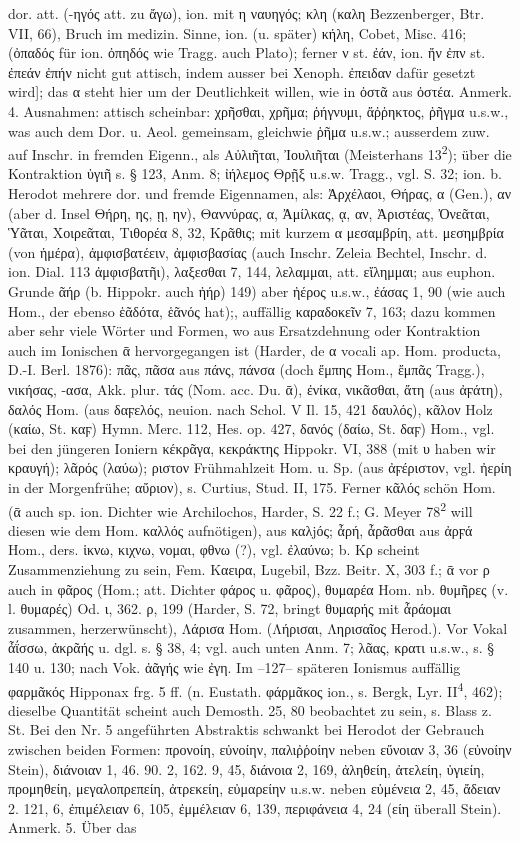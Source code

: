 dor. att. (-ηγός att. zu ἄγω), ion. mit η ναυηγός; κλη (καλη Bezzenberger, Btr. VII, 66), Bruch im medizin. Sinne, ion. (u. später) κήλη, Cobet, Misc. 416; (ὀπαδός für ion. ὀπηδός wie Tragg. auch Plato); ferner ν st. ἐάν, ion. ἤν ἐπν st. ἐπεάν ἐπήν nicht gut attisch, indem ausser bei Xenoph. ἐπειδαν dafür gesetzt wird]; das α steht hier um der Deutlichkeit willen, wie in ὀστᾶ aus ὀστέα. Anmerk. 4. Ausnahmen: attisch scheinbar: χρῆσθαι, χρῆμα; ῥήγνυμι, ἄῤῥηκτος, ῥῆγμα u.s.w., was auch dem Dor. u. Aeol. gemeinsam, gleichwie ῥῆμα u.s.w.; ausserdem zuw. auf Inschr. in fremden Eigenn., als Αὐλιῆται, Ἰουλιῆται (Meisterhans 13\textsuperscript{2}); über die Kontraktion ὑγιῆ s. § 123, Anm. 8; ἰήλεμος Θρῇξ u.s.w. Tragg., vgl. S. 32; ion. b. Herodot mehrere dor. und fremde Eigennamen, als: Ἀρχέλαοι, Θήρας, α (Gen.), αν (aber d. Insel Θήρη, ης, ῃ, ην), Θαννύρας, α, Ἀμίλκας, ᾳ, αν, Ἀριστέας, Ὀνεᾶται, Ὑᾶται, Χοιρεᾶται, Τιθορέα 8, 32, Κρᾶθις; mit kurzem α μεσαμβρίη, att. μεσημβρία (von ἡμέρα), ἀμφισβατέειν, ἀμφισβασίας (auch Inschr. Zeleia Bechtel, Inschr. d. ion. Dial. 113 ἀμφισβατῆι), λαξεσθαι 7, 144, λελαμμαι, att. εἴλημμαι; aus euphon. Grunde ᾶήρ (b. Hippokr. auch ἠήρ) 149) aber ἠέρος u.s.w., ἐάσας 1, 90 (wie auch Hom., der ebenso ἑᾶδότα, ἑᾶνός hat);, auffällig καραδοκεῖν 7, 163; dazu kommen aber sehr viele Wörter und Formen, wo aus Ersatzdehnung oder Kontraktion auch im Ionischen ᾱ hervorgegangen ist (Harder, de α vocali ap. Hom. producta, D.-I. Berl. 1876): πᾶς, πᾶσα aus πάνς, πάνσα (doch ἔμπης Hom., ἔμπᾶς Tragg.), νικήσας, -ασα, Akk. plur. τάς (Nom. acc. Du. ᾱ), ἐνίκα, νικᾶσθαι, ἄτη (aus ἀϝάτη), δαλός Hom. (aus δαϝελός, neuion. nach Schol. V Il. 15, 421 δαυλός), κᾶλον Holz (καίω, St. καϝ) Hymn. Merc. 112, Hes. op. 427, δανός (δαίω, St. δαϝ) Hom., vgl. bei den jüngeren Ioniern κέκρᾶγα, κεκράκτης Hippokr. VI, 388 (mit υ haben wir κραυγή); λᾶρός (λαύω); ριστον Frühmahlzeit Hom. u. Sp. (aus ἀϝέριστον, vgl. ἠερίη in der Morgenfrühe; αὔριον), s. Curtius, Stud. II, 175. Ferner κᾶλός schön Hom. (ᾱ auch sp. ion. Dichter wie Archilochos, Harder, S. 22 f.; G. Meyer 78\textsuperscript{2} will diesen wie dem Hom. καλλός aufnötigen), aus καλjός; ἆρή, ἆρᾶσθαι aus ἀρϝά Hom., ders. ἱκνω, κιχνω, νομαι, φθνω (?), vgl. ἐλαύνω; b. Κρ scheint Zusammenziehung zu sein, Fem. Καειρα, Lugebil, Bzz. Beitr. X, 303 f.; ᾱ vor ρ auch in φᾶρος (Hom.; att. Dichter φάρος u. φᾶρος), θυμαρέα Hom. nb. θυμῆρες (v. l. θυμαρές) Od. ι, 362. ρ, 199 (Harder, S. 72, bringt θυμαρής mit ἆράομαι zusammen, herzerwünscht), Λάρισα Hom. (Λήρισαι, Ληρισαῖος Herod.). Vor Vokal ἆΐσσω, ἀκρᾶής u. dgl. s. § 38, 4; vgl. auch unten Anm. 7; λᾶας, κρατι u.s.w., s. § 140 u. 130; nach Vok. ἀᾶγής wie ἐγη. Im --127-- späteren Ionismus auffällig φαρμᾶκός Hipponax frg. 5 ff. (n. Eustath. φάρμᾶκος ion., s. Bergk, Lyr. II\textsuperscript{4}, 462); dieselbe Quantität scheint auch Demosth. 25, 80 beobachtet zu sein, s. Blass z. St. Bei den Nr. 5 angeführten Abstraktis schwankt bei Herodot der Gebrauch zwischen beiden Formen: προνοίη, εὐνοίην, παλιῤῥοίην neben εὔνοιαν 3, 36 (εὐνοίην Stein), διάνοιαν 1, 46. 90. 2, 162. 9, 45, διάνοια 2, 169, ἀληθείη, ἀτελείη, ὑγιείη, προμηθείη, μεγαλοπρεπείη, ἀτρεκείη, εὐμαρείην u.s.w. neben εὐμένεια 2, 45, ἄδειαν 2. 121, 6, ἐπιμέλειαν 6, 105, ἐμμέλειαν 6, 139, περιφάνεια 4, 24 (είη überall Stein). Anmerk. 5. Über das 